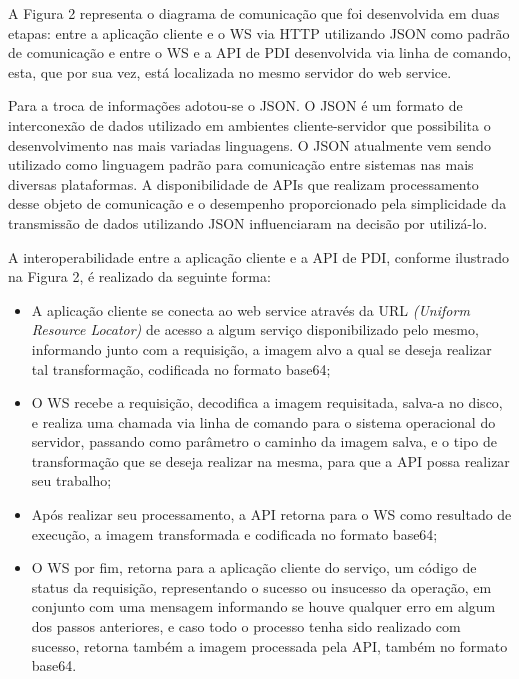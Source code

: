\documentclass[12pt]{article}
\begin{document}
A Figura 2 representa o diagrama de comunicação que
foi desenvolvida em duas etapas: entre a aplicação cliente e o WS via HTTP utilizando JSON como padrão de comunicação e entre
o WS e a API de PDI desenvolvida via linha de comando, esta, que por sua vez, está localizada no mesmo servidor do web service.

Para a troca de informações adotou-se o JSON. O
JSON é um formato de interconexão de dados utilizado em ambientes cliente-servidor
que possibilita o desenvolvimento nas mais variadas linguagens. O JSON atualmente
vem sendo utilizado como linguagem padrão para comunicação entre sistemas nas mais
diversas plataformas. A disponibilidade de APIs que realizam processamento desse objeto de comunicação e o desempenho proporcionado
pela simplicidade da transmissão de dados utilizando JSON influenciaram na decisão
por utilizá-lo.

A interoperabilidade entre a aplicação cliente e a API de PDI, conforme ilustrado na Figura 2, é
realizado da seguinte forma:
\begin{itemize}
	\item A aplicação cliente se conecta ao web service através da URL \textit{(Uniform Resource Locator)} de acesso a algum serviço disponibilizado pelo mesmo, informando junto com a requisição, a imagem alvo a qual se deseja realizar tal transformação, codificada no formato base64;
	\item O WS recebe a requisição, decodifica a imagem requisitada, salva-a no disco, e realiza uma chamada via linha de comando para o sistema operacional do servidor, passando como parâmetro o caminho da imagem salva, e o tipo de transformação que se deseja realizar na mesma, para que a API possa realizar seu trabalho;
	\item Após realizar seu processamento, a API retorna para o WS como resultado de execução, a imagem transformada e codificada no formato base64;
	\item O WS por fim, retorna para a aplicação cliente do serviço, um código de status da requisição, representando o sucesso ou insucesso da operação, em conjunto com uma mensagem informando se houve qualquer erro em algum dos passos anteriores, e caso todo o processo tenha sido realizado com sucesso, retorna também a imagem processada pela API, também no formato base64.
\end{itemize}
\end{document}
